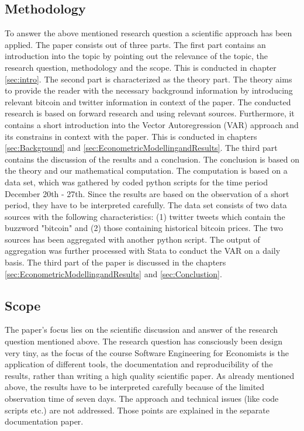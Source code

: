 \documentclass[a4paper,american,12pt]{article}
\begin{document}
\begin{spacing}{1.2}
\subsection{Methodology}
\label{sec:Methodology}
To answer the above mentioned research question a scientific approach has been applied. The paper consists out of three parts. The first part contains an introduction into the topic by pointing out the relevance of the topic, the research question, methodology and the scope. This is conducted in chapter \ref{sec:intro}. The second part is characterized as the theory part. The theory aims to provide the reader with the necessary background information by introducing relevant bitcoin and twitter information in context of the paper. The conducted research is based on forward research and using relevant sources. Furthermore, it contains a short introduction into the Vector Autoregression (VAR) approach and its constrains in context with the paper. This is conducted in chapters \ref{sec:Background} and \ref{sec:EconometricModellingandResults}. The third part contains the discussion of the results and a conclusion. The conclusion is based on the theory and our mathematical computation. The computation is based on a data set, which was gathered by coded python scripts for the time period December 20th - 27th. Since the results are based on the observation of a short period, they have to be interpreted carefully. The data set consists of two data sources with the following characteristics: (1) twitter tweets which contain the buzzword "bitcoin" and (2) those containing historical bitcoin prices. The two sources has been aggregated with another python script. The output of aggregation was further processed with Stata to conduct the VAR on a daily basis. The third part of the paper is discussed in the chapters \ref{sec:EconometricModellingandResults} and \ref{sec:Conclustion}.

\subsection{Scope}
\label{sec:Scope}
The paper's focus lies on the scientific discussion and answer of the research question mentioned above. The research question has consciously been design very tiny, as the focus of the course Software Engineering for Economists is the application of different tools, the documentation and reproducibility of the results, rather than writing a high quality scientific paper. As already mentioned above, the results have to be interpreted carefully because of the limited observation time of seven days. The approach and technical issues (like code scripts etc.) are not addressed. Those points are explained in the separate documentation paper.


\end{spacing}
\end{document}
